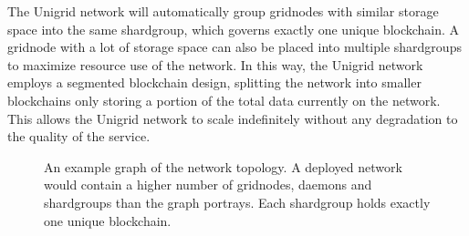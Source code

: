 \documentclass[10pt,a4paper,final]{article}
\begin{document}
\noindent
The Unigrid network will automatically group \glspl{gridnode} with similar storage space into the same \gls{shardgroup}, which governs exactly one unique blockchain. A \gls{gridnode} with a lot of storage space can also be placed into multiple \glspl{shardgroup} to maximize resource use of the network. In this way, the Unigrid network employs a segmented blockchain design, splitting the network into smaller blockchains only storing a portion of the total data currently on the network. This allows the Unigrid network to scale indefinitely without any degradation to the quality of the service.

\begin{figure}[H]
\centering
{}
\caption{An example graph of the network topology. A deployed network would contain a higher number of \glspl{gridnode}, daemons and \glspl{shardgroup} than the graph portrays. Each \gls{shardgroup} holds exactly one unique blockchain.}
\end{figure}

\end{document}
